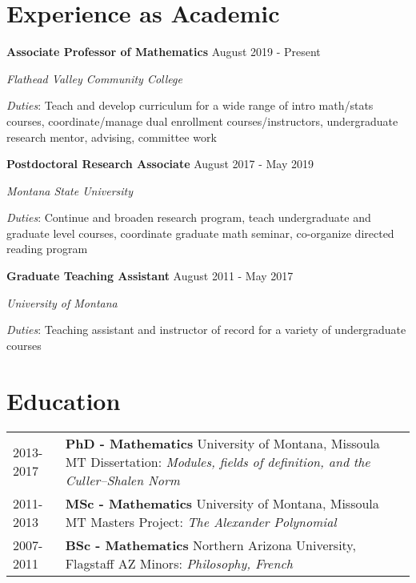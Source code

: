 \documentclass[12pt]{article}
\begin{document}
\newpage

\section{Experience as Academic}

\noindent  \textbf{Associate Professor of Mathematics} \hfill August  2019 - Present 

\textit{Flathead Valley Community College}



\textit{Duties}: Teach and develop curriculum for a wide range of intro math/stats courses, coordinate/manage dual enrollment   courses/instructors, undergraduate research mentor, advising, committee work

\textbf{Postdoctoral Research Associate} \hfill August 2017 - May 2019

\textit{Montana State University}

\textit{Duties}: Continue and broaden research program, teach undergraduate  and graduate level courses, coordinate graduate math seminar, co-organize directed reading program

\noindent \textbf{Graduate Teaching Assistant} \hfill August  2011 - May 2017

\textit{University of Montana}

\textit{Duties}: Teaching assistant and instructor of record for a variety of undergraduate courses



\section{Education}

\begin{tabular}{ l p{15in} }
    2013-2017 & \textbf{PhD - Mathematics} 
    \newline University of Montana, Missoula MT
    \newline Dissertation: \textit{Modules, fields of definition, and the Culler--Shalen Norm} \\ 

        2011-2013 & \textbf{MSc - Mathematics} 
    \newline University of Montana, Missoula MT
    \newline Masters Project: \textit{The Alexander Polynomial}\\  
    
        2007-2011 & \textbf{BSc - Mathematics} 
    \newline Northern Arizona University, Flagstaff AZ
    \newline Minors: \textit{Philosophy, French} \\ 
\end{tabular}
\end{document}
